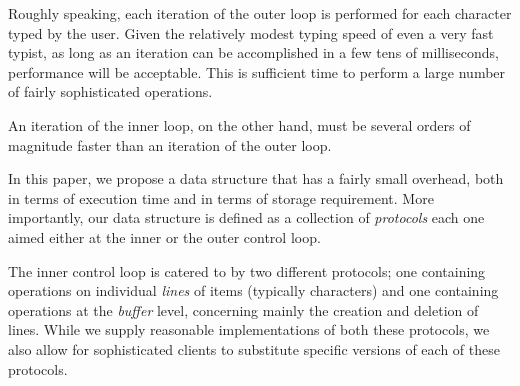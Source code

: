 Roughly speaking, each iteration of the outer loop is performed for
each character typed by the user.  Given the relatively modest typing
speed of even a very fast typist, as long as an iteration can be
accomplished in a few tens of milliseconds, performance will be
acceptable.  This is sufficient time to perform a large number of
fairly sophisticated operations.

An iteration of the inner loop, on the other hand, must be several
orders of magnitude faster than an iteration of the outer loop.

In this paper, we propose a data structure that has a fairly small
overhead, both in terms of execution time and in terms of storage
requirement.  More importantly, our data structure is defined as a
collection of \clos{} \emph{protocols} each one aimed either at the
inner or the outer control loop.

The inner control loop is catered to by two different protocols; one
containing operations on individual \emph{lines} of items (typically
characters) and one containing operations at the \emph{buffer} level,
concerning mainly the creation and deletion of lines.  While we supply
reasonable implementations of both these protocols, we also allow for
sophisticated clients to substitute specific versions of each of these
protocols.

